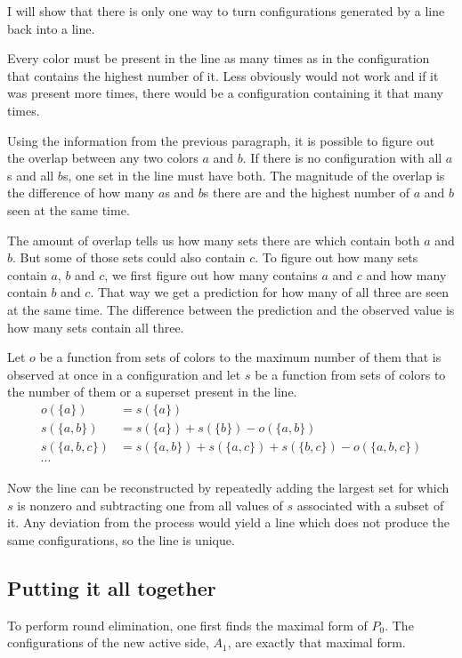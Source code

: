 \documentclass[english, 12pt, a4paper, sci, a-1b, online]{aaltothesis}
\begin{document}
I will show that there is only one way to turn configurations generated by a line back into a line.

Every color must be present in the line as many times as in the configuration that contains the highest number of it. Less obviously would not work and if it was present more times, there would be a configuration containing it that many times.

Using the information from the previous paragraph, it is possible to figure out the overlap between any two colors $a$ and $b$. If there is no configuration with all $a$s and all $b$s, one set in the line must have both. The magnitude of the overlap is the difference of how many $a$s and $b$s there are and the highest number of $a$ and $b$ seen at the same time.

The amount of overlap tells us how many sets there are which contain both $a$ and $b$. But some of those sets could also contain $c$. To figure out how many sets contain $a$, $b$ and $c$, we first figure out how many contains $a$ and $c$ and how many contain $b$ and $c$. That way we get a prediction for how many of all three are seen at the same time. The difference between the prediction and the observed value is how many sets contain all three.

Let $o$ be a function from sets of colors to the maximum number of them that is observed at once in a configuration and let $s$ be a function from sets of colors to the number of them or a superset present in the line.
\begin{align*}
  o(\{a\}) &= s(\{a\}) \\
  s(\{a, b\}) &= s(\{a\}) + s(\{b\}) - o(\{a, b\}) \\
  s(\{a, b, c\}) &= s(\{a, b\}) + s(\{a, c\}) + s(\{b, c\}) - o(\{a, b, c\}) \\
  \cdots
\end{align*}

Now the line can be reconstructed by repeatedly adding the largest set for which $s$ is nonzero and subtracting one from all values of $s$ associated with a subset of it. Any deviation from the process would yield a line which does not produce the same configurations, so the line is unique.

\subsection{Putting it all together}

To perform round elimination, one first finds the maximal form of $P_0$. The configurations of the new active side, $A_1$, are exactly that maximal form.
\end{document}
